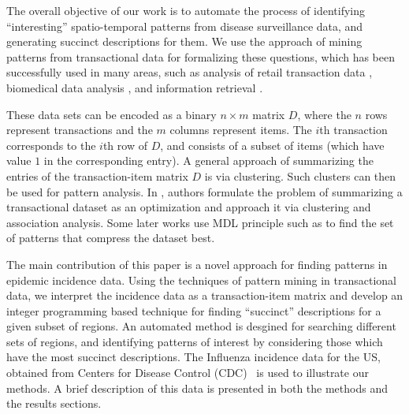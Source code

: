 The overall objective of our work is to automate the process of
identifying ``interesting'' spatio-temporal patterns from 
disease surveillance data,
and generating succinct descriptions for them.
We use the approach of mining patterns from transactional data
for formalizing these questions, which has been successfully used 
in many areas, such as analysis of retail transaction data \cite{assocmining},
biomedical data analysis \cite{madeira1, xiang:dmkd2011}, and information retrieval \cite{infretr2004}.

These data sets can be encoded as a binary $n\times m$ matrix $D$,
where the $n$ rows represent transactions and the $m$ columns 
represent items. The $i$th transaction corresponds to the $i$th row of $D$, and
consists of a subset of items (which have value $1$ in the corresponding
entry).
A general approach of summarizing the entries of the transaction-item matrix $D$ is via clustering.
Such clusters can then be used for pattern analysis. In \cite{chandola:icdm05}, authors formulate the problem of summarizing a transactional dataset as an optimization and approach it via clustering and association analysis. Some later works use MDL principle such as \cite{Vreeken2011, miettinen2011} to find the set of patterns that compress the dataset best.

The main contribution of this paper is
a novel approach for finding patterns in epidemic incidence data.
Using the techniques of pattern mining in transactional data, we interpret the incidence data
as a transaction-item matrix and develop an integer programming based technique for finding 
``succinct'' descriptions for a given subset of regions.
An automated method is desgined for searching 
different sets of regions, and identifying patterns of interest
by considering those which have the most succinct descriptions.
The Influenza incidence data for the US, obtained from Centers for 
Disease Control (CDC)~\cite{cdc:surveillance-report-feb10} is used to illustrate
our methods. A brief description of this data is presented in both the methods and the
results sections.


